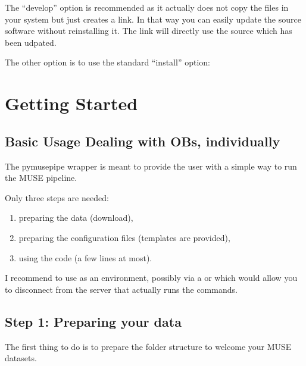 \documentclass[letterpaper,10pt,english]{sphinxmanual}
\begin{document}
\sphinxAtStartPar
The “develop” option is recommended as it actually does not copy
the files in your system but just creates a link.
In that way you can easily update the source software without
reinstalling it. The link will directly use the source which has been udpated.

\sphinxAtStartPar
The other option is to use the standard “install” option:

\begin{sphinxVerbatim}[commandchars=\\\{\}]
  
\end{sphinxVerbatim}

\sphinxstepscope


\section{Getting Started}
\label{\detokenize{getting_started:getting-started}}\label{\detokenize{getting_started::doc}}

\subsection{Basic Usage \sphinxhyphen{} Dealing with OBs, individually}
\label{\detokenize{getting_started:basic-usage-dealing-with-obs-individually}}
\sphinxAtStartPar
The pymusepipe wrapper is meant to provide the user with a simple way to
run the MUSE pipeline.

\sphinxAtStartPar
Only three steps are needed:
\begin{enumerate}
%
\item {} 
\sphinxAtStartPar
preparing the data (download),

\item {} 
\sphinxAtStartPar
preparing the configuration files (templates are provided),

\item {} 
\sphinxAtStartPar
using the code (a few lines at most).

\end{enumerate}

\sphinxAtStartPar
I recommend to use  as an environment, possibly via
a  or  which would allow you to disconnect from the server that
actually runs the commands.


\subsection{Step 1: Preparing your data}
\label{\detokenize{getting_started:step-1-preparing-your-data}}
\sphinxAtStartPar
The first thing to do is to prepare the folder structure to welcome your
MUSE datasets.
\end{document}
